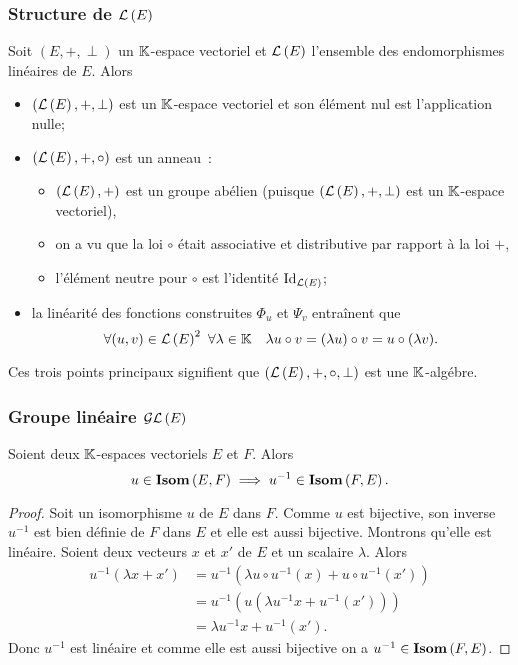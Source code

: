 \subsubsection{Structure de \(\mathcal{L}\left(E\right)\)}

Soit \((E,+,\perp)\) un \(\mathbb{K}\)-espace vectoriel et \(\mathcal{L}\left(E\right)\) l'ensemble des endomorphismes linéaires de \(E\). Alors
\begin{itemize}
  \item \((\mathcal{L}\left(E\right),+,\perp)\) est un \(\mathbb{K}\)-espace vectoriel et son élément nul est l'application nulle;
  \item \((\mathcal{L}\left(E\right), +, \circ)\) est un anneau~:
    \begin{itemize}
      \item \((\mathcal{L}\left(E\right),+)\) est un groupe abélien (puisque \((\mathcal{L}\left(E\right),+,\perp)\) est un \(\mathbb{K}\)-espace vectoriel),
      \item on a vu que la loi \(\circ\) était associative et distributive par rapport à la loi \(+\),
      \item l'élément neutre pour \(\circ\) est l'identité \(\operatorname{Id}_{\mathcal{L}\left(E\right)}\);
    \end{itemize}
  \item la linéarité des fonctions construites \(\Phi_u\) et \(\Psi_v\) entraînent que
    \begin{equation}
      \forall (u,v) \in \mathcal{L}\left(E\right)^2 \ \forall \lambda \in \mathbb{K} \quad \lambda u \circ v = (\lambda u) \circ v = u \circ (\lambda v).
    \end{equation}
\end{itemize}

Ces trois points principaux signifient que \((\mathcal{L}\left(E\right),+,\circ, \perp)\) est une \(\mathbb{K}\)-algébre.

\subsubsection{Groupe linéaire \(\mathcal{GL}\left(E\right)\)}

\begin{theo}
  Soient deux \(\mathbb{K}\)-espaces vectoriels \(E\) et \(F\). Alors
  \begin{equation}
    u \in \mathbf{Isom}\left(E,F\right) \implies u^{-1} \in \mathbf{Isom}\left(F,E\right).
  \end{equation}
\end{theo}
\begin{proof}
  Soit un isomorphisme \(u\) de \(E\) dans \(F\). Comme \(u\) est bijective, son inverse \(u^{-1}\) est bien définie de \(F\) dans \(E\) et elle est aussi bijective. Montrons qu'elle est linéaire. Soient deux vecteurs \(x\) et \(x'\) de \(E\) et un scalaire \(\lambda\). Alors
  \begin{align}
    u^{-1}(\lambda x+x') &= u^{-1}(\lambda u\circ u^{-1} (x) + u \circ u^{-1}(x')) \\
                         &=u^{-1}(u(\lambda u^{-1} x +u^{-1}(x'))) \\
                         &=\lambda u^{-1} x +u^{-1}(x').
  \end{align}
  Donc \(u^{-1}\) est linéaire et comme elle est aussi bijective on a \(u^{-1} \in \mathbf{Isom}\left(F,E\right)\).
\end{proof}

